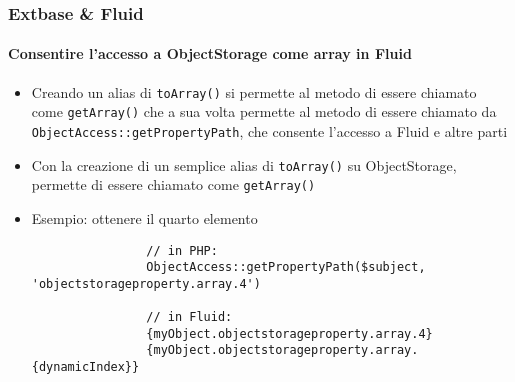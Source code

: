 \begin{frame}[fragile]
	\frametitle{Extbase \& Fluid}
	\framesubtitle{Consentire l'accesso a ObjectStorage come array in Fluid}

	\lstset{basicstyle=\tiny\ttfamily}

	\begin{itemize}

		\item Creando un alias di \texttt{toArray()} si permette al metodo di essere
			chiamato come \texttt{getArray()} che a sua volta permette al metodo di
			essere chiamato da \texttt{ObjectAccess::getPropertyPath},
			che consente l'accesso a Fluid e altre parti

		\item Con la creazione di un semplice alias di \texttt{toArray()} su
			ObjectStorage, permette di essere chiamato come \texttt{getArray()}

		\item Esempio: ottenere il quarto elemento

			\begin{lstlisting}
				// in PHP:
				ObjectAccess::getPropertyPath($subject, 'objectstorageproperty.array.4')

				// in Fluid:
				{myObject.objectstorageproperty.array.4}
				{myObject.objectstorageproperty.array.{dynamicIndex}}
			\end{lstlisting}

	\end{itemize}

\end{frame}

